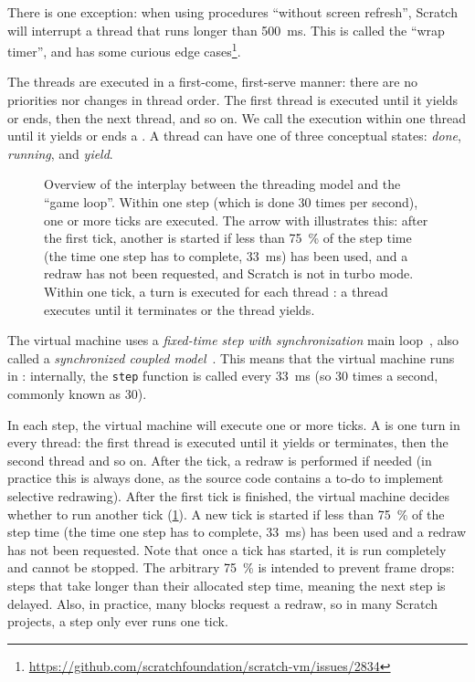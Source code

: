 \documentclass[../main]{subfiles}
\begin{document}
There is one exception: when using procedures ``without screen refresh'', Scratch will interrupt a thread that runs longer than \qty{500}{\milli\second}.
This is called the ``wrap timer'', and has some curious edge cases\footnote{\url{https://github.com/scratchfoundation/scratch-vm/issues/2834}}.

The threads are executed in a first-come, first-serve manner: there are no priorities nor changes in thread order.
The first thread is executed until it yields or ends, then the next thread, and so on.
We call the execution within one thread until it yields or ends a .
A thread can have one of three conceptual states: \emph{done}, \emph{running}, and \emph{yield}.

\begin{figure}
    \centering
    
    \caption{Overview of the interplay between the threading model and the ``game loop''. Within one step (which is done 30 times per second), one or more ticks are executed. The arrow with  illustrates this: after the first tick, another is started if less than \qty{75}{\percent} of the step time (the time one step has to complete, \qty{33}{\milli\second}) has been used, and a redraw has not been requested, and Scratch is not in turbo mode. Within one tick, a turn is executed for each thread : a thread executes until it terminates or the thread yields.}
    \label{fig:scratch-model-explained}
\end{figure}

The virtual machine uses a \emph{fixed-time step with synchronization} main loop~\autocite{nystromGameProgrammingPatterns2014}, also called a \emph{synchronized coupled model}~\autocite{valenteRealTimeGame2005}.
This means that the virtual machine runs in : internally, the \texttt{step} function is called every \qty{33}{\milli\second} (so 30 times a second, commonly known as \qty{30}{\fps}).

In each step, the virtual machine will execute one or more ticks.
A  is one turn in every thread: the first thread is executed until it yields or terminates, then the second thread and so on.
After the tick, a redraw is performed if needed (in practice this is always done, as the source code contains a to-do to implement selective redrawing).
After the first tick is finished, the virtual machine decides whether to run another tick (\cref{fig:scratch-model-explained}).
A new tick is started if less than \qty{75}{\percent} of the step time (the time one step has to complete, \qty{33}{\milli\second}) has been used and a redraw has not been requested.
Note that once a tick has started, it is run completely and cannot be stopped.
The arbitrary \qty{75}{\percent} is intended to prevent frame drops: steps that take longer than their allocated step time, meaning the next step is delayed.
Also, in practice, many blocks request a redraw, so in many Scratch projects, a step only ever runs one tick.
\end{document}

